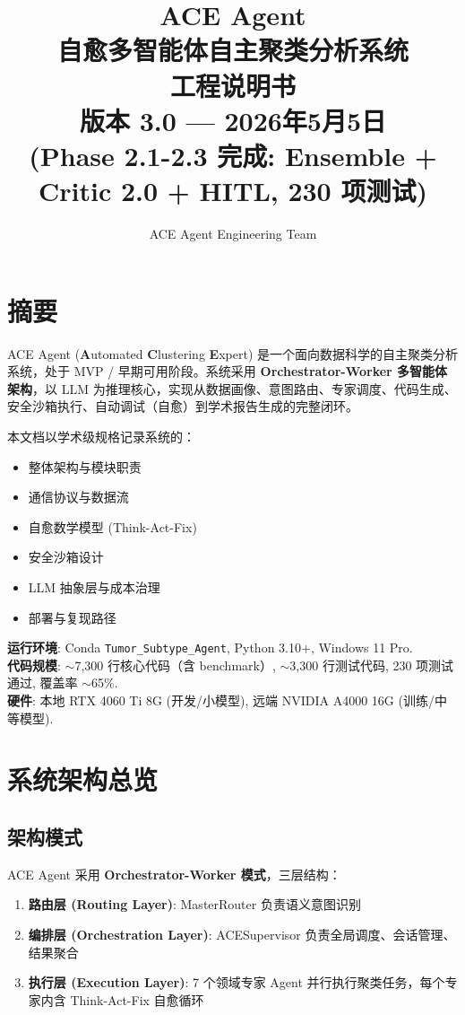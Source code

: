 \documentclass[12pt,a4paper]{article}
\title{
    \textbf{ACE Agent}\\[4pt]
    \large 自愈多智能体自主聚类分析系统\\[6pt]
    \Large 工程说明书\\[12pt]
    \normalsize 版本 3.0 — 2026年5月5日\\
    \normalsize (Phase 2.1-2.3 完成: Ensemble + Critic 2.0 + HITL, 230 项测试)
}
\author{ACE Agent Engineering Team}
\date{}
\begin{document}
\maketitle
\tableofcontents
\newpage

\section{摘要}

ACE Agent (\textbf{A}utomated \textbf{C}lustering \textbf{E}xpert) 是一个面向数据科学的自主聚类分析系统，处于 MVP / 早期可用阶段。系统采用 \textbf{Orchestrator-Worker 多智能体架构}，以 LLM 为推理核心，实现从数据画像、意图路由、专家调度、代码生成、安全沙箱执行、自动调试（自愈）到学术报告生成的完整闭环。

本文档以学术级规格记录系统的：
\begin{itemize}[nosep]
    \item 整体架构与模块职责
    \item 通信协议与数据流
    \item 自愈数学模型 (Think-Act-Fix)
    \item 安全沙箱设计
    \item LLM 抽象层与成本治理
    \item 部署与复现路径
\end{itemize}

\medskip
\textbf{运行环境}: Conda \texttt{Tumor\_Subtype\_Agent}, Python 3.10+, Windows 11 Pro.\\
\textbf{代码规模}: $\sim$7,300 行核心代码（含 benchmark）, $\sim$3,300 行测试代码, 230 项测试通过, 覆盖率 $\sim$65\%.\\
\textbf{硬件}: 本地 RTX 4060 Ti 8G (开发/小模型), 远端 NVIDIA A4000 16G (训练/中等模型).

\newpage

\section{系统架构总览}

\subsection{架构模式}

ACE Agent 采用 \textbf{Orchestrator-Worker 模式}，三层结构：

\begin{enumerate}[nosep]
    \item \textbf{路由层 (Routing Layer)}: MasterRouter 负责语义意图识别
    \item \textbf{编排层 (Orchestration Layer)}: ACESupervisor 负责全局调度、会话管理、结果聚合
    \item \textbf{执行层 (Execution Layer)}: 7 个领域专家 Agent 并行执行聚类任务，每个专家内含 Think-Act-Fix 自愈循环
\end{enumerate}
\end{document}

